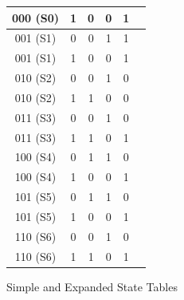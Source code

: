 \documentclass[12pt]{article}
\begin{document}
\begin{figure}[H]
{{\begin{tabular}{|c|c|c|c|c|c|}
				000 (S0)             & 1              & 0                & 0                & 1                \\
				\hline
				001 (S1)             & 0              & 0                & 1                & 1                \\
				001 (S1)             & 1              & 0                & 0                & 1                \\
				\hline
				010 (S2)             & 0              & 0                & 1                & 0                \\
				010 (S2)             & 1              & 1                & 0                & 0                \\
				\hline
				011 (S3)             & 0              & 0                & 1                & 0                \\
				011 (S3)             & 1              & 1                & 0                & 1                \\
				\hline
				100 (S4)             & 0              & 1                & 1                & 0                \\
				100 (S4)             & 1              & 0                & 0                & 1                \\
				\hline
				101 (S5)             & 0              & 1                & 1                & 0                \\
				101 (S5)             & 1              & 0                & 0                & 1                \\
				\hline
				110 (S6)             & 0              & 0                & 1                & 0                \\
				110 (S6)             & 1              & 1                & 0                & 1                \\
				\hline
			\end{tabular}
		}
	}
	\caption{Simple and Expanded State Tables}
\end{figure}
\end{document}
